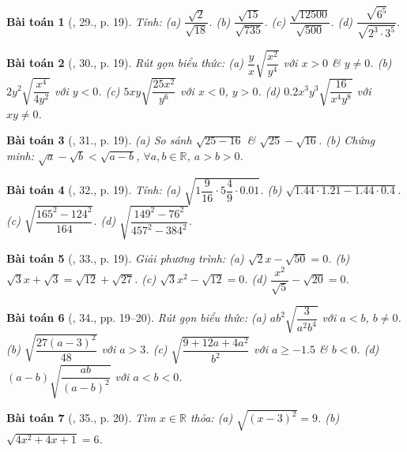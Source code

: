 \documentclass{article}
\newtheorem{baitoan}{Bài toán}
\begin{document}
\begin{baitoan}[\cite{SGK_Toan_9_tap_1}, 29., p. 19]
	Tính: (a) $\dfrac{\sqrt{2}}{\sqrt{18}}$. (b) $\dfrac{\sqrt{15}}{\sqrt{735}}$. (c) $\dfrac{\sqrt{12500}}{\sqrt{500}}$. (d) $\dfrac{\sqrt{6^5}}{\sqrt{2^3\cdot3^5}}$.
\end{baitoan}

\begin{baitoan}[\cite{SGK_Toan_9_tap_1}, 30., p. 19]
	Rút gọn biểu thức: (a) $\dfrac{y}{x}\sqrt{\dfrac{x^2}{y^4}}$ với $x > 0$ \& $y\ne0$. (b) $2y^2\sqrt{\dfrac{x^4}{4y^2}}$ với $y < 0$. (c) $5xy\sqrt{\dfrac{25x^2}{y^6}}$ với $x < 0$, $y > 0$. (d) $0.2x^3y^3\sqrt{\dfrac{16}{x^4y^8}}$ với $xy\ne0$.
\end{baitoan}

\begin{baitoan}[\cite{SGK_Toan_9_tap_1}, 31., p. 19]
	(a) So sánh $\sqrt{25 - 16}$ \& $\sqrt{25} - \sqrt{16}$. (b) Chứng minh: $\sqrt{a} - \sqrt{b} < \sqrt{a - b}$, $\forall a,b\in\mathbb{R}$, $a > b > 0$.
\end{baitoan}

\begin{baitoan}[\cite{SGK_Toan_9_tap_1}, 32., p. 19]
	Tính: (a) $\sqrt{1\dfrac{9}{16}\cdot5\dfrac{4}{9}\cdot0.01}$. (b) $\sqrt{1.44\cdot1.21 - 1.44\cdot0.4}$. (c) $\sqrt{\dfrac{165^2 - 124^2}{164}}$. (d) $\sqrt{\dfrac{149^2 - 76^2}{457^2 - 384^2}}$.
\end{baitoan}

\begin{baitoan}[\cite{SGK_Toan_9_tap_1}, 33., p. 19]
	Giải phương trình: (a)  $\sqrt{2}x - \sqrt{50} = 0$. (b) $\sqrt{3}x + \sqrt{3} = \sqrt{12} + \sqrt{27}$. (c) $\sqrt{3}x^2 - \sqrt{12} = 0$. (d) $\dfrac{x^2}{\sqrt{5}} - \sqrt{20} = 0$.
\end{baitoan}

\begin{baitoan}[\cite{SGK_Toan_9_tap_1}, 34., pp. 19--20]
	Rút gọn biểu thức: (a) $ab^2\sqrt{\dfrac{3}{a^2b^4}}$ với $a < b$, $b\ne0$. (b) $\sqrt{\dfrac{27(a - 3)^2}{48}}$ với $a > 3$. (c) $\sqrt{\dfrac{9 + 12a + 4a^2}{b^2}}$ với $a\ge-1.5$ \& $b < 0$. (d) $(a - b)\sqrt{\dfrac{ab}{(a - b)^2}}$ với $a < b < 0$.
\end{baitoan}

\begin{baitoan}[\cite{SGK_Toan_9_tap_1}, 35., p. 20]
	Tìm $x\in\mathbb{R}$ thỏa: (a) $\sqrt{(x - 3)^2} = 9$. (b) $\sqrt{4x^2 + 4x + 1} = 6$.
\end{baitoan}
\end{document}
